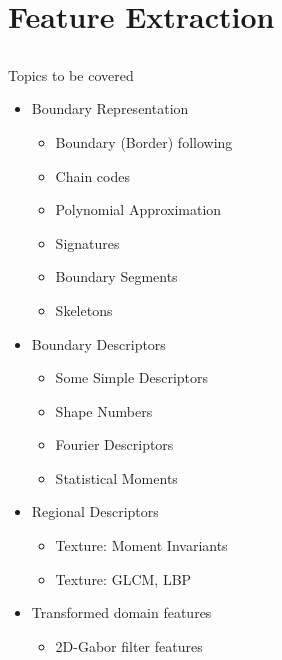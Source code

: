 \section{Feature Extraction}
\subsection{}

\begin{frame}{Topics to be covered}
\begin{itemize}
\item Boundary Representation\nocite{gonzalez2002digital}
\begin{itemize}
\setlength{\itemsep}{-2pt}
\item Boundary (Border) following
\item Chain codes
\item Polynomial Approximation
\item Signatures
\item Boundary Segments
\item Skeletons
\end{itemize}
\item Boundary Descriptors
\begin{itemize}
\setlength{\itemsep}{-2pt}
\item Some Simple Descriptors
\item Shape Numbers
\item Fourier Descriptors
\item Statistical Moments
\end{itemize}
\item Regional Descriptors
\begin{itemize}
\setlength{\itemsep}{-2pt}
\item Texture: Moment Invariants
\item Texture: GLCM, LBP
\end{itemize}
\item Transformed domain features
\begin{itemize}
\item 2D-Gabor filter features
\end{itemize}
\end{itemize}
\end{frame}

